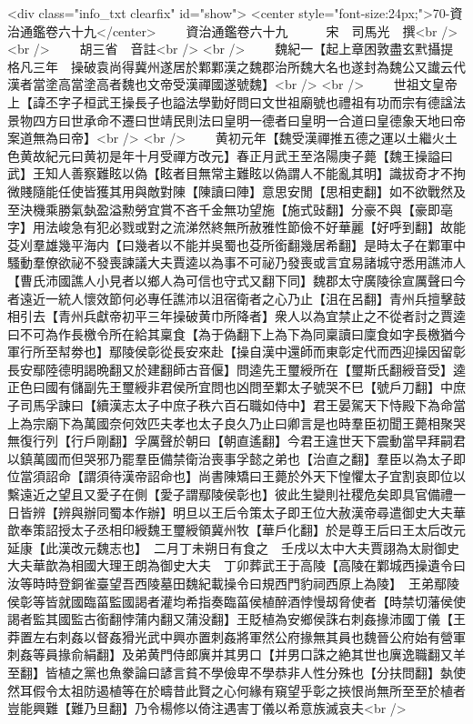 <div class="info_txt clearfix" id="show">
<center style="font-size:24px;">70-資治通鑑卷六十九</center>
  　　資治通鑑卷六十九　　　宋　司馬光　撰<br />
<br />
　　胡三省　音註<br />
<br />
　　魏紀一【起上章困敦盡玄黓攝提格凡三年　操破袁尚得冀州遂居於鄴鄴漢之魏郡治所魏大名也遂封為魏公又䜟云代漢者當塗高當塗高者魏也文帝受漢禪國遂號魏】<br />
<br />
　　世祖文皇帝上【諱丕字子桓武王操長子也謚法學勤好問曰文世祖廟號也禮祖有功而宗有德諡法景物四方曰世承命不遷曰世靖民則法曰皇明一德者曰皇明一合道曰皇德象天地曰帝案道無為曰帝】<br />
<br />
　　黄初元年【魏受漢禪推五德之運以土繼火土色黄故紀元曰黄初是年十月受禪方改元】春正月武王至洛陽庚子薨【魏王操謚曰武】王知人善察難眩以偽【眩者目無常主難眩以偽謂人不能亂其明】識拔奇才不拘微賤隨能任使皆獲其用與敵對陳【陳讀曰陣】意思安閒【思相吏翻】如不欲戰然及至決機乘勝氣埶盈溢勲勞宜賞不吝千金無功望施【施式䜴翻】分豪不與【豪即亳字】用法峻急有犯必戮或對之流涕然終無所赦雅性節儉不好華麗【好呼到翻】故能芟刈羣雄幾平海内【曰幾者以不能并吳蜀也芟所銜翻幾居希翻】是時太子在鄴軍中騷動羣僚欲祕不發喪諫議大夫賈逵以為事不可祕乃發喪或言宜易諸城守悉用譙沛人【曹氏沛國譙人小見者以鄉人為可信也守式又翻下同】魏郡太守廣陵徐宣厲聲曰今者遠近一統人懷效節何必專任譙沛以沮宿衛者之心乃止【沮在呂翻】青州兵擅擊鼓相引去【青州兵獻帝初平三年操破黄巾所降者】衆人以為宜禁止之不從者討之賈逵曰不可為作長檄令所在給其稟食【為于偽翻下上為下為同稟讀曰廩食如字長檄猶今軍行所至幇劵也】鄢陵侯彰從長安來赴【操自漢中還師而東彰定代而西迎操因留彰長安鄢陸德明謁晩翻又於建翻師古音偃】問逵先王璽綬所在【璽斯氏翻綬音受】逵正色曰國有儲副先王璽綬非君侯所宜問也凶問至鄴太子號哭不巳【號戶刀翻】中庶子司馬孚諫曰【續漢志太子中庶子秩六百石職如侍中】君王晏駕天下恃殿下為命當上為宗廟下為萬國奈何效匹夫孝也太子良久乃止曰卿言是也時羣臣初聞王薨相聚哭無復行列【行戶剛翻】孚厲聲於朝曰【朝直遙翻】今君王違世天下震動當早拜嗣君以鎮萬國而但哭邪乃罷羣臣備禁衛治喪事孚懿之弟也【治直之翻】羣臣以為太子即位當須詔命【謂須待漢帝詔命也】尚書陳矯曰王薨於外天下惶懼太子宜割哀即位以繫遠近之望且又愛子在側【愛子謂鄢陵侯彰也】彼此生變則社稷危矣即具官備禮一日皆辨【辨與辦同蜀本作辦】明旦以王后令策太子即王位大赦漢帝尋遣御史大夫華歆奉策詔授太子丞相印綬魏王璽綬領冀州牧【華戶化翻】於是尊王后曰王太后改元延康【此漢改元魏志也】　二月丁未朔日有食之　壬戌以太中大夫賈詡為太尉御史大夫華歆為相國大理王朗為御史大夫　丁卯葬武王于高陵【高陵在鄴城西操遺令曰汝等時時登銅雀臺望吾西陵墓田魏紀載操令曰規西門豹祠西原上為陵】　王弟鄢陵侯彰等皆就國臨菑監國謁者灌均希指奏臨菑侯植醉酒悖慢刼脅使者【時禁切藩侯使謁者監其國監古銜翻悖蒲内翻又蒲没翻】王貶植為安鄉侯誅右刺姦掾沛國丁儀【王莽置左右刺姦以督姦猾光武中興亦置刺姦將軍然公府掾無其員也魏晉公府始有營軍刺姦等員掾俞絹翻】及弟黄門侍郎廙并其男口【并男口誅之絶其世也廙逸職翻又羊至翻】皆植之黨也魚豢論曰諺言貧不學儉卑不學恭非人性分殊也【分扶問翻】埶使然耳假令太祖防遏植等在於疇昔此賢之心何緣有窺望乎彰之挾恨尚無所至至於植者豈能興難【難乃旦翻】乃令楊修以倚注遇害丁儀以希意族滅哀夫<br />
